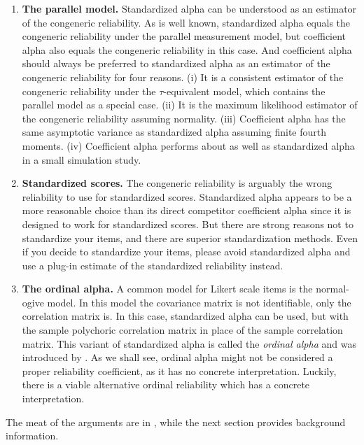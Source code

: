 \documentclass[twoside]{article}
\begin{document}
\begin{enumerate}[label=(\Alph*)]

\item \textbf{The parallel model.} Standardized alpha can be understood as an estimator of the congeneric reliability. As is well known, standardized alpha equals the congeneric reliability under the parallel measurement model, but coefficient alpha also equals the congeneric reliability in this case. And coefficient alpha should always be preferred to standardized alpha as an estimator of the congeneric reliability for four reasons. (i) It is a consistent estimator of the congeneric reliability under the $\tau$-equivalent model, which contains the parallel model as a special case. (ii) It is the maximum likelihood estimator of the congeneric reliability assuming normality. (iii) Coefficient alpha has the same asymptotic variance as standardized alpha assuming finite fourth moments. (iv) Coefficient alpha performs about as well as standardized alpha in a small simulation study.
\item \textbf{Standardized scores.} The congeneric reliability is arguably the wrong reliability to use for standardized scores. Standardized alpha appears to be a more reasonable choice than its direct competitor coefficient alpha since it is designed to work for standardized scores. But there are strong reasons not to standardize your items, and there are superior standardization methods. Even if you decide to standardize your items, please avoid standardized alpha and use a plug-in estimate of the standardized reliability instead.
\item \textbf{The ordinal alpha.} A common model for Likert scale items is the normal-ogive model. In this model the covariance matrix is not identifiable, only the correlation matrix is. In this case, standardized alpha can be used, but with the sample polychoric correlation matrix in place of the sample correlation matrix. This variant of standardized alpha is called the \textit{ordinal alpha} and was introduced by \citet{Zumbo2007-ap}. As we shall see, ordinal alpha might not be considered a proper reliability coefficient, as it has no concrete interpretation. Luckily, there is a viable alternative ordinal reliability which has a concrete interpretation. 
\end{enumerate}

The meat of the arguments are in , while the next section provides background information.
\end{document}

